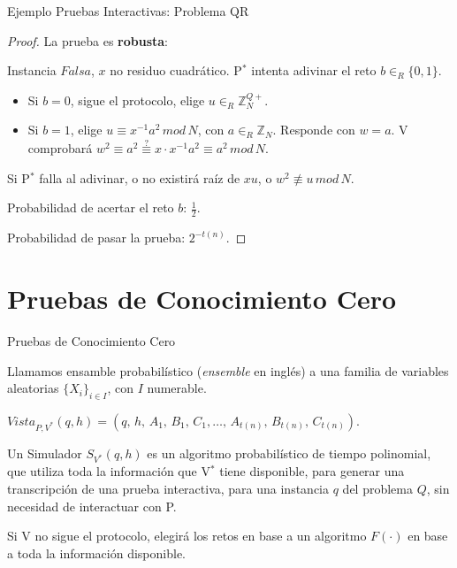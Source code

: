 \documentclass{beamer}
\begin{document}
\begin{frame}{Ejemplo Pruebas Interactivas: Problema QR}
\begin{proof}
	La prueba es \textbf{robusta}:
	
	Instancia $Falsa$, $x$ no residuo cuadrático.
	P$^*$ intenta adivinar el reto $b\in_R\{0,1\}$.
	\begin{itemize}
		\item Si $b=0$, sigue el protocolo, elige $u \in_R \mathbb{Z}^{Q+}_N$.
		
		\item Si $b=1$, elige $u \equiv x^{-1} a^2 \, mod \, N$, con $a \in_R \mathbb{Z}_N$.
		Responde con $w = a$.		
		V comprobará $w^2\equiv a^2 \overset{?}{\equiv} x\cdot x^{-1} a^2 \equiv a^2 \, mod \, N$.
	\end{itemize}

	Si P$^*$ falla al adivinar, o no existirá raíz de $xu$, o $w^2 \not \equiv u \, mod \, N$.
	
	Probabilidad de acertar el reto $b$: $\frac{1}{2}$.
	
	Probabilidad de pasar la prueba: $2^{-t(n)}$.
	
\end{proof}
\end{frame}



\section{Pruebas de Conocimiento Cero}


\begin{frame}{Pruebas de Conocimiento Cero} 
	\begin{definition}[Ensamble] 
		Llamamos ensamble probabilístico (\textit{ensemble} en inglés) a una familia de variables aleatorias $\{X_i\}_{i\in I}$, con $I$ numerable. 
	\end{definition} 
	$ Vista_{P,V^*}(q,h) = (q,\,h,\,A_1,\,B_1,\,C_1, \dots ,\,A_{t(n)},\,B_{t(n)},\,C_{t(n)}). $ 
	
	\begin{definition}[Simulador] 
		Un Simulador $S_{V^*}(q,h)$ es un algoritmo probabilístico de tiempo polinomial, que utiliza toda la información que V$^*$ tiene disponible, para generar una transcripción de una prueba interactiva, para una instancia $q$ del problema $Q$, sin necesidad de interactuar con P. 
	\end{definition} 
	Si V no sigue el protocolo, elegirá los retos en base a un algoritmo $F(\cdot)$ en base a toda la información disponible. 
\end{frame} 
\end{document}
